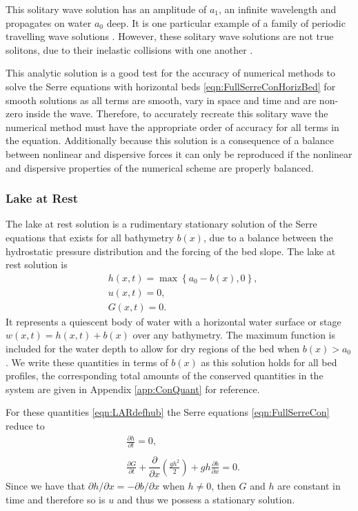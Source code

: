 This solitary wave solution has an amplitude of $a_1$, an infinite wavelength and propagates on water $a_0$ deep. It is one particular example of a family of periodic travelling wave solutions \cite{El-etal-2006}. However, these solitary wave solutions are not true solitons, due to their inelastic collisions with one another \cite{Dutykh-etal-2013-761}. 

This analytic solution is a good test for the accuracy of numerical methods to solve the Serre equations with horizontal beds \eqref{eqn:FullSerreConHorizBed} for smooth solutions as all terms are smooth, vary in space and time and are non-zero inside the wave. Therefore, to accurately recreate this solitary wave the numerical method must have the appropriate order of accuracy for all terms in the equation. Additionally because this solution is a consequence of a balance between nonlinear and dispersive forces it can only be reproduced if the nonlinear and dispersive properties of the numerical scheme are properly balanced.

\subsubsection{Lake at Rest}
The lake at rest solution is a rudimentary stationary solution of the Serre equations that exists for all bathymetry $b(x)$, due to a balance between the hydrostatic pressure distribution and the forcing of the bed slope. The lake at rest solution is
\begin{subequations}
	\begin{align}
	&h(x,t) = \max\left\lbrace a_0 - b(x), 0 \right\rbrace, \\
	&u(x,t) = 0 , \\
	&G(x,t) = 0 .
	\end{align}
	\label{eqn:LARdefhub}
\end{subequations}
It represents a quiescent body of water with a horizontal water surface or stage $w(x,t) = h(x,t) + b(x)$ over any bathymetry. The maximum function is included for the water depth to allow for dry regions of the bed when $b(x) > a_0$. We write these quantities in terms of $b(x)$ as this solution holds for all bed profiles, the corresponding total amounts of the conserved quantities in the system are given in Appendix \ref{app:ConQuant} for reference. 

For these quantities \eqref{eqn:LARdefhub} the Serre equations \eqref{eqn:FullSerreCon} reduce to
\begin{align*}
& \frac{\partial h}{\partial t}  = 0 , \\  \nonumber \\
&\frac{\partial G}{\partial t}  +\dfrac{\partial}{\partial x} \left(\frac{gh^2}{2}\right) + gh \frac{\partial b}{\partial x} = 0.
\end{align*}
Since we have that $\partial h / \partial x =  - \partial b / \partial x$ when $h \neq 0$, then $G$ and $h$ are constant in time and therefore so is $u$ and thus we possess a stationary solution. 

